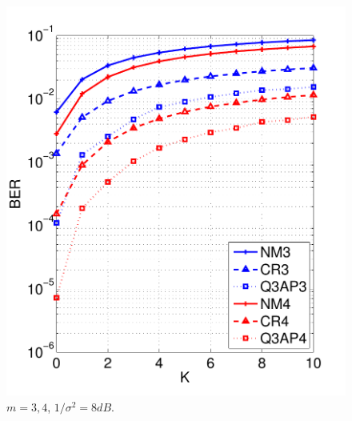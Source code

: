 \documentclass{beamer}
\begin{document}
\begin{frame}
\begin{columns}
    \begin{figure}
      \includegraphics[width=1.0\textwidth]{figs/BER_K_MonteCarlo_64QAM_8.pdf}
      \caption{$m=3,4$, $1/\sigma^2 = 8dB$.}
    \end{figure}
  \end{columns}
\end{frame}
\end{document}
